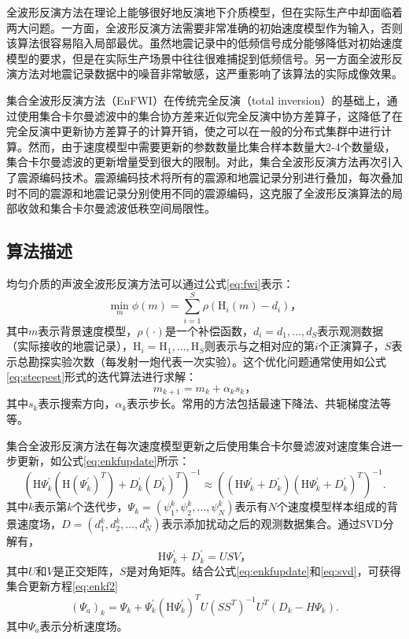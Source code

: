 全波形反演方法在理论上能够很好地反演地下介质模型，但在实际生产中却面临着两大问题。一方面，全波形反演方法需要非常准确的初始速度模型作为输入，否则该算法很容易陷入局部最优\cite{virieux2009overview}。虽然地震记录中的低频信号成分能够降低对初始速度模型的要求，但是在实际生产场景中往往很难捕捉到低频信号\cite{sirgue2006importance}。另一方面全波形反演方法对地震记录数据中的噪音非常敏感，这严重影响了该算法的实际成像效果。

集合全波形反演方法（EnFWI）\cite{yushu,he2015ensemble}在传统完全反演\cite{tarantola1982generalized}（total inversion）的基础上，通过使用集合卡尔曼滤波\cite{evensen2003ensemble}中的集合协方差来近似完全反演中协方差算子，这降低了在完全反演中更新协方差算子的计算开销，使之可以在一般的分布式集群中进行计算。然而，由于速度模型中需要更新的参数数量比集合样本数量大2-4个数量级，集合卡尔曼滤波的更新增量受到很大的限制。对此，集合全波形反演方法再次引入了震源编码技术\cite{krebs2009fast}。震源编码技术将所有的震源和地震记录分别进行叠加，每次叠加时不同的震源和地震记录分别使用不同的震源编码，这克服了全波形反演算法的局部收敛\cite{castellanos2014fast}和集合卡尔曼滤波低秩空间局限性。

\subsection{算法描述}
均匀介质的声波全波形反演方法可以通过公式\ref{eq:fwi}表示：
\begin{equation}
\label{eq:fwi}
  \min_{m} \phi(m) = \sum_{i=1}^S \rho(\mbox{H}_i(m) - d_{i} )，
\end{equation}
其中$m$表示背景速度模型，$\rho(\cdot)$是一个补偿函数，$d_i=d_1, \ldots, d_S$表示观测数据（实际接收的地震记录），$\mbox{H}_i=\mbox{H}_1, \ldots, \mbox{H}_S$则表示与之相对应的第$i$个正演算子，$S$表示总勘探实验次数（每发射一炮代表一次实验）。这个优化问题通常使用如公式\ref{eq:steepest}形式的迭代算法进行求解：
\begin{equation}
\label{eq:steepest}
m_{k+1} = m_{k} + \alpha_{k}s_k，
\end{equation}
其中$s_k$表示搜索方向，$\alpha_{k}$表示步长。常用的方法包括最速下降法、共轭梯度法等等。

集合全波形反演方法在每次速度模型更新之后使用集合卡尔曼滤波对速度集合进一步更新，如公式\ref{eq:enkfupdate}所示：
\begin{equation}
\label{eq:enkfupdate}
\left(\mbox{H}\Psi_k^{'}(\mbox{H}(\Psi_k^{'})^T)+D_k^{'}(D_k^{'})^T\right)^{-1}\approx\left((\mbox{H}\Psi_k^{'}+D_k^{'})(\mbox{H}\Psi_k^{'}+D_k^{'})^T\right)^{-1}.
\end{equation}
其中$k$表示第$k$个迭代步，$\Psi_k=(\psi_1^k,\psi_2^k,\ldots,\psi_N^k)$表示有$N$个速度模型样本组成的背景速度场，$D=(d_1^k,d_2^k,\ldots,d_N^k)$表示添加扰动之后的观测数据集合。通过SVD分解有，
\begin{equation}
\label{eq:svd}
\mbox{H}\Psi_k^{'}+D_k^{'}=USV，
\end{equation}
其中$U$和$V$是正交矩阵，$S$是对角矩阵。结合公式\ref{eq:enkfupdate}和\ref{eq:svd}，可获得集合更新方程\ref{eq:enkf2}
\begin{equation}
\label{eq:enkf2}
(\Psi_a)_k=\Psi_k+\Psi_k^{'}(\mbox{H}\Psi_k^{'})^TU(SS^T)^{-1}U^T(D_k-H\Psi_k).
\end{equation}
其中$\Psi_a$表示分析速度场。

